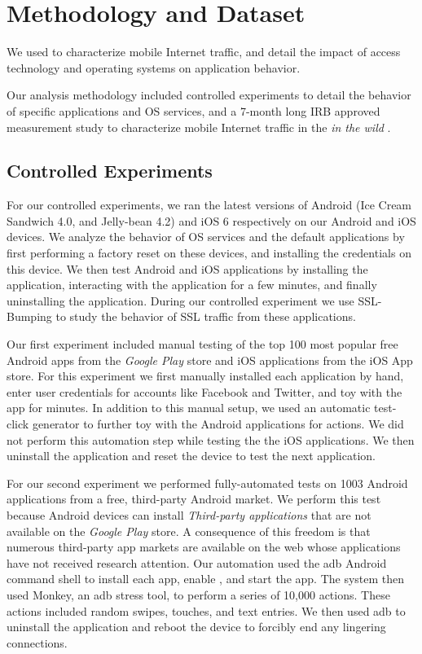 \section{Methodology and Dataset}
\label{sec:Methodology}

We used \platname to characterize mobile Internet traffic, and detail the impact of access technology and operating systems on application behavior. 

Our analysis methodology included controlled experiments to detail the behavior of specific applications and OS services, and a 7-month long IRB approved measurement study to characterize mobile Internet traffic in the \emph{in the wild} . 

\subsection{Controlled Experiments}

For our controlled experiments, we ran the latest versions of Android (Ice Cream Sandwich 4.0, and Jelly-bean 4.2) and iOS 6 respectively on our Android and iOS devices. 
We analyze the behavior of OS services and the default applications by first performing a factory reset on these devices, and installing the \platname credentials on this device.
We then test Android and iOS applications by installing the application, interacting with the application for a few minutes, and finally uninstalling the  application. 
During our controlled experiment we use SSL-Bumping to study the behavior of SSL traffic from these applications. 

Our first experiment included manual testing of the top 100 most popular free Android apps from the \emph{Google Play} store and \tbd{} iOS applications from the iOS App store.
For this experiment we first manually installed each application by hand, enter user credentials for accounts like Facebook and Twitter, and toy with the app for \tbd{} minutes. 
In addition to this manual setup, we used an automatic test-click generator to further toy with the Android applications for \tbd{} actions. 
We did not perform this automation step while testing the the iOS applications.
We then uninstall the application and reset the device to test the next application. 

For our second experiment we performed fully-automated tests on 1003 Android applications from a free, third-party Android market.
We perform this test because Android devices can install \emph{Third-party applications} that are not available on the \emph{Google Play} store.
A consequence of this freedom is that numerous third-party app markets are available on the web whose applications have not received research attention.
Our automation used the adb Android command shell to install each app, enable \platname, and start the app.
The system then used Monkey, an adb stress tool, to perform a series of 10,000 actions. 
These actions included random swipes, touches, and text entries.
We then used adb to uninstall the application and reboot the device to forcibly end any lingering connections.

